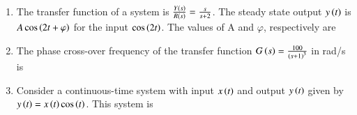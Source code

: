 \documentclass[journal,12pt,onecolumn]{IEEEtran}
\theoremstyle{remark}
\begin{document}
\begin{enumerate}[start=1, label=Q.\arabic*]
    \hfill{}

    \item The transfer function of a system is $\frac{Y\left(s\right)}{R\left(s\right)}=\frac{s}{s+2}$. The steady state output $y\left(t\right)$ is $A \cos\left(2t+\varphi\right)$ for the input $\cos\left(2t\right)$. The values of A and $\varphi$, respectively are
    \begin{enumerate}
    \end{enumerate}

    \hfill{}

    \item The phase cross-over frequency of the transfer function $G\left(s\right)=\frac{100}{\left(s+1\right)^{3}}$ in rad/s is
    \begin{enumerate}
    \end{enumerate}

    \hfill{}

    \item Consider a continuous-time system with input $x\left(t\right)$ and output $y\left(t\right)$ given by $y\left(t\right)=x\left(t\right)\cos\left(t\right)$. This system is
    \begin{enumerate}
    \end{enumerate}


\end{enumerate}
\end{document}
